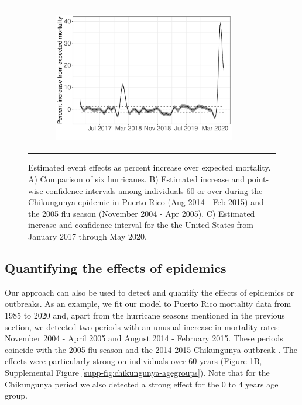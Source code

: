 \documentclass[11pt]{article}
\begin{document}
\begin{figure}[ht]
\begin{tabular}{lll}
\begin{subfigure}[t]{0.30\linewidth}
		\includegraphics[width=1\linewidth]{figs/figure-1c.pdf}
	\end{subfigure}\\
    \end{tabular}
    \caption{Estimated event effects as percent increase over expected mortality. A) Comparison of six hurricanes. B) Estimated increase and point-wise confidence intervals among individuals 60 or over during the Chikungunya epidemic in Puerto Rico (Aug 2014 - Feb 2015) and the 2005 flu season (November 2004 - Apr 2005). C) Estimated increase and confidence interval for the the United States from January 2017 through May 2020.}
    \label{fig:fhat-estimates}
\end{figure}

\subsection{Quantifying the effects of epidemics}
\label{subsec:epidemics}
Our approach can also be used to detect and quantify the effects of epidemics or outbreaks. As an example, we fit our model to Puerto Rico mortality data from 1985 to 2020 and, apart from the hurricane seasons mentioned in the previous section, we detected two periods with an unusual increase in mortality rates: November 2004 - April 2005 and August 2014 - February 2015. These periods coincide with the 2005 flu season and the 2014-2015 Chikungunya outbreak \cite{sharp2016surveillance, hsu2019risk}. The effects were particularly strong on individuals over 60 years (Figure \ref{fig:fhat-estimates}B, Supplemental Figure \ref{supp-fig:chikungunya-agegroups}). Note that for the Chikungunya period we also detected a strong effect for the  0 to 4 years age group. 
\end{document}
